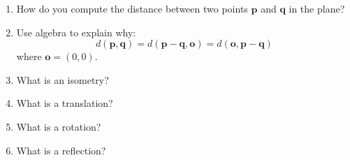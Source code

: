 \documentclass[12pt]{report}
\renewcommand{\vec}{\mathbf}
\begin{document}
\problems

\begin{enumerate}
\item How do you compute the distance between two points $\vec{p}$ and
  $\vec{q}$ in the plane?
\item Use algebra to explain why: 
\[
d(\vec{p},\vec q) = d(\vec{p}-\vec q,\vec o) = d(\vec o,\vec{p}-\vec q)
\]
where $\vec o = (0,0)$.
\item What is an isometry?
\item What is a translation?
\item What is a rotation?
\item What is a reflection?
\end{enumerate}
\end{document}
